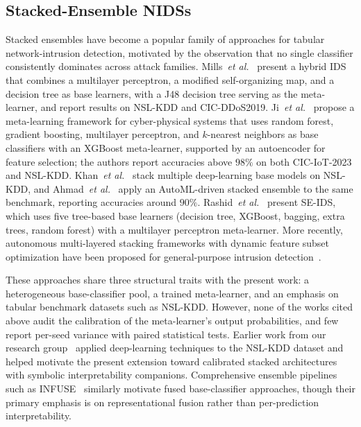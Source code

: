 \documentclass[pdflatex,sn-mathphys-num]{sn-jnl}
\theoremstyle{thmstyleone}
\theoremstyle{thmstyletwo}
\theoremstyle{thmstylethree}
\begin{document}
\subsection{Stacked-Ensemble NIDSs}
Stacked ensembles have become a popular family of approaches for tabular network-intrusion detection, motivated by the observation that no single classifier consistently dominates across attack families. Mills~\textit{et al.}~\cite{mills2024hybrid} present a hybrid IDS that combines a multilayer perceptron, a modified self-organizing map, and a decision tree as base learners, with a J48 decision tree serving as the meta-learner, and report results on NSL-KDD and CIC-DDoS2019. Ji~\textit{et al.}~\cite{ji2025stacked} propose a meta-learning framework for cyber-physical systems that uses random forest, gradient boosting, multilayer perceptron, and $k$-nearest neighbors as base classifiers with an XGBoost meta-learner, supported by an autoencoder for feature selection; the authors report accuracies above $98\%$ on both CIC-IoT-2023 and NSL-KDD. Khan~\textit{et al.}~\cite{khan2024robust} stack multiple deep-learning base models on NSL-KDD, and Ahmad~\textit{et al.}~\cite{ahmad2024automl} apply an AutoML-driven stacked ensemble to the same benchmark, reporting accuracies around $90\%$. Rashid~\textit{et al.}~\cite{rashid2022twostage} present SE-IDS, which uses five tree-based base learners (decision tree, XGBoost, bagging, extra trees, random forest) with a multilayer perceptron meta-learner. More recently, autonomous multi-layered stacking frameworks with dynamic feature subset optimization have been proposed for general-purpose intrusion detection~\cite{bah2025autonomous}.

These approaches share three structural traits with the present work: a heterogeneous base-classifier pool, a trained meta-learner, and an emphasis on tabular benchmark datasets such as NSL-KDD. However, none of the works cited above audit the calibration of the meta-learner's output probabilities, and few report per-seed variance with paired statistical tests. Earlier work from our research group~\cite{gurung2019deep} applied deep-learning techniques to the NSL-KDD dataset and helped motivate the present extension toward calibrated stacked architectures with symbolic interpretability companions. Comprehensive ensemble pipelines such as INFUSE~\cite{infuse2023} similarly motivate fused base-classifier approaches, though their primary emphasis is on representational fusion rather than per-prediction interpretability.
\end{document}
